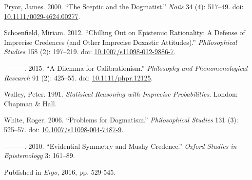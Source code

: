 \documentclass[
  11pt,
  letterpaper,
  DIV=11,
  numbers=noendperiod,
  twoside]{scrartcl}
\newlength{\cslhangindent}
\newenvironment{CSLReferences}[2] %
 {\begin{list}{}{%
  \setlength{\itemindent}{0pt}
  \setlength{\leftmargin}{0pt}
  \setlength{\parsep}{0pt}
  \ifodd #1
   \setlength{\leftmargin}{\cslhangindent}
   \setlength{\itemindent}{-1\cslhangindent}
  \fi
  \setlength{\itemsep}{#2\baselineskip}}}
 {\end{list}}
\begin{document}
\begin{CSLReferences}{1}{0}
Pryor, James. 2000. {``The Sceptic and the Dogmatist.''} \emph{No{û}s}
34 (4): 517--49. doi:
\href{https://doi.org/10.1111/0029-4624.00277}{10.1111/0029-4624.00277}.

Schoenfield, Miriam. 2012. {``Chilling Out on Epistemic Rationality: A
Defense of Imprecise Credences (and Other Imprecise Doxastic
Attitudes).''} \emph{Philosophical Studies} 158 (2): 197--219. doi:
\href{https://doi.org/10.1007/s11098-012-9886-7}{10.1007/s11098-012-9886-7}.

---------. 2015. {``A Dilemma for Calibrationism.''} \emph{Philosophy
and Phenomenological Research} 91 (2): 425--55. doi:
\href{https://doi.org/10.1111/phpr.12125}{10.1111/phpr.12125}.

Walley, Peter. 1991. \emph{Statisical Reasoning with Imprecise
Probabilities}. London: Chapman \& Hall.

White, Roger. 2006. {``Problems for Dogmatism.''} \emph{Philosophical
Studies} 131 (3): 525--57. doi:
\href{https://doi.org/10.1007/s11098-004-7487-9}{10.1007/s11098-004-7487-9}.

---------. 2010. {``Evidential Symmetry and Mushy Credence.''}
\emph{Oxford Studies in Epistemology} 3: 161--89.

\end{CSLReferences}



\noindent Published in\emph{
Ergo}, 2016, pp. 529-545.
\end{document}
